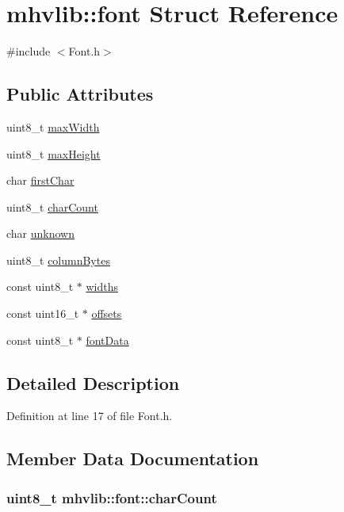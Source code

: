 \hypertarget{structmhvlib_1_1font}{\section{mhvlib\-:\-:font Struct Reference}
\label{structmhvlib_1_1font}
}


{\ttfamily \#include $<$Font.\-h$>$}

\subsection*{Public Attributes}
\begin{DoxyCompactItemize}
\item 
uint8\-\_\-t \hyperlink{structmhvlib_1_1font_a491f7e655d97619153af9e477fa4a384}{max\-Width}
\item 
uint8\-\_\-t \hyperlink{structmhvlib_1_1font_adf62dff1d90d212f2e8ef22c48d80682}{max\-Height}
\item 
char \hyperlink{structmhvlib_1_1font_a0b1d1726828b96ff6a69ff4809a2d864}{first\-Char}
\item 
uint8\-\_\-t \hyperlink{structmhvlib_1_1font_a5feb3dc048e591fadae38bcf18f08251}{char\-Count}
\item 
char \hyperlink{structmhvlib_1_1font_afc2c3bb2a37e1563ac0564553e535971}{unknown}
\item 
uint8\-\_\-t \hyperlink{structmhvlib_1_1font_a9fd6e0570a3257e455e1ad8771a6806b}{column\-Bytes}
\item 
const uint8\-\_\-t $\ast$ \hyperlink{structmhvlib_1_1font_a28889052cc78935d95331e63af5dd389}{widths}
\item 
const uint16\-\_\-t $\ast$ \hyperlink{structmhvlib_1_1font_acb130c182d0ee5ba43aee7b00e1e9fad}{offsets}
\item 
const uint8\-\_\-t $\ast$ \hyperlink{structmhvlib_1_1font_aeb4011b646d2ee424d91226ceea9c00e}{font\-Data}
\end{DoxyCompactItemize}


\subsection{Detailed Description}


Definition at line 17 of file Font.\-h.



\subsection{Member Data Documentation}
\hypertarget{structmhvlib_1_1font_a5feb3dc048e591fadae38bcf18f08251}{
\subsubsection[{char\-Count}]{\setlength{\rightskip}{0pt plus 5cm}uint8\-\_\-t mhvlib\-::font\-::char\-Count}}\label{structmhvlib_1_1font_a5feb3dc048e591fadae38bcf18f08251}



